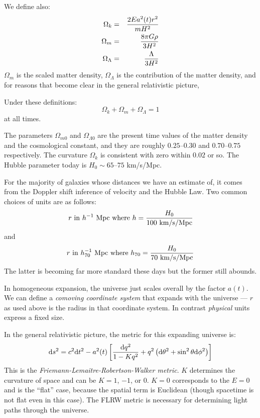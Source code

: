 We define also:
\begin{eqnarray}
\Omega_k &=& \frac{2Ea^2(t) r^2}{mH^2} \cr
\Omega_m &=& \frac{8\pi G\rho}{3H^2}\cr
\Omega_\Lambda &=& \frac{\Lambda}{3H^2} 
\end{eqnarray}
$\Omega_m$ is the scaled matter density, $\Omega_\Lambda$ is the
contribution of the matter density, and for reasons that become clear
in the general relativistic picture, 

Under these definitions:
\begin{equation}
\Omega_k + \Omega_m + \Omega_\Lambda = 1
\end{equation}
at all times.
  
The parameters $\Omega_{m0}$ and $\Omega_{\Lambda 0}$ are the present
time values of the matter density and the cosmological constant, and
they are roughly $0.25$--$0.30$ and $0.70$--$0.75$ respectively.  The
curvature $\Omega_k$ is consistent with zero within $0.02$ or so.
The Hubble parameter today is $H_0 \sim 65$--$75$ km/s/Mpc. 

For the majority of galaxies whose distances we have an estimate of,
it comes from the Doppler shift inference of velocity and the Hubble
Law. Two common choices of units are as follows:
\begin{equation}
r {\rm ~in~}h^{-1}{\rm ~Mpc} {\rm ~where~} h = \frac{H_0}{100 {\rm
    ~km/s/Mpc}} 
\end{equation}
and 
\begin{equation}
r {\rm ~in~}h_{70}^{-1}{\rm ~Mpc} {\rm ~where~} h_{70} = \frac{H_0}{70
  {\rm ~km/s/Mpc}}
\end{equation}
The latter is becoming far more standard these days but the former
still abounds.

In homogeneous expansion, the universe just scales overall by the
factor $a(t)$. We can define a {\it comoving coordinate system} that
expands with the universe --- $r$ as used above is the radius in that
coordinate system. In contrast {\it physical} units express a fixed
size.

In the general relativistic picture, the metric for this expanding
universe is:
\begin{equation}
{\rm d}s^2 = c^2 {\rm d}t^2 - a^2(t) \left[ \frac{{\rm d}q^2}{1-Kq^2}
  + q^2\left({\rm d}\theta^2+ \sin^2\theta{\rm d}\phi^2\right) \right] 
\end{equation}
This is the {\it Friemann-Lemaitre-Robertson-Walker metric}.  $K$
determines the curvature of space and can be $K=1$, $-1$, or $0$.
$K=0$ corresponds to the $E=0$ and is the ``flat'' case, because the
spatial term is Euclidean (though spacetime is not flat even in this
case).  The FLRW metric is necessary for determining light paths
through the universe.


